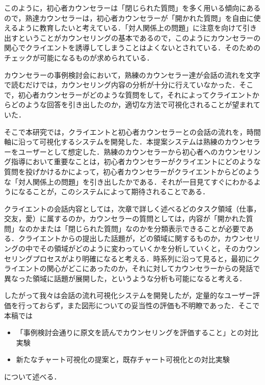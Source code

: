 \documentclass[shuuron]{kuee}
\begin{document}
このように，初心者カウンセラーは「閉じられた質問」を多く用いる傾向にあるので，熟達カウンセラーは，初心者カウンセラーが「開かれた質問」を自由に使えるように教育したいと考えている．「対人関係上の問題」に注意を向けて引き出すということがカウンセリングの基本であるので，このようにカウンセラーの関心でクライエントを誘導してしまうことはよくないとされている．そのためのチェックが可能になるものが求められている．

カウンセラーの事例検討会において，熟練のカウンセラー達が会話の流れを文字で読むだけでは，カウンセリング内容の分析が十分に行えていなかった．そこで，初心者カウンセラーがどのような質問をして，それによってクライエントからどのような回答を引き出したのか，適切な方法で可視化されることが望まれていた．

そこで本研究では，クライエントと初心者カウンセラーとの会話の流れを，時間軸に沿って可視化するシステムを開発した．本提案システムは熟練のカウンセラーをユーザーとして想定した．熟練のカウンセラーから初心者へのカウンセリング指導において重要なことは，初心者カウンセラーがクライエントにどのような質問を投げかけるかによって，初心者カウンセラーがクライエントからどのような「対人関係上の問題」を引き出したかである．それが一目見てすぐにわかるようになることが，このシステムによって期待されることである．%



クライエントの会話内容としては，次章で詳しく述べるどのタスク領域（仕事，交友，愛）に属するのか，カウンセラーの質問としては，内容が「開かれた質問」なのかまたは「閉じられた質問」なのかを分類表示できることが必要である．クライエントからの提出した話題が，どの領域に関するものか，カウンセリングの中でその領域がどのように変わっていくかを分析していくと，そのカウンセリングプロセスがより明確になると考える．時系列に沿って見ると，最初にクライエントの関心がどこにあったのか，それに対してカウンセラーからの発話で異なった領域に話題が展開した，というような分析も可能になると考える．

したがって我々\cite{uetsuji}は会話の流れ可視化システムを開発したが，定量的なユーザー評価を行っておらず，また図形についての妥当性の評価も不明瞭であった．そこで本稿では
\begin{itemize}
  \item 「事例検討会通りに原文を読んでカウンセリングを評価すること」との対比実験
  \item 新たなチャート可視化の提案と，既存チャート可視化との対比実験
\end{itemize}
について述べる．
\end{document}
